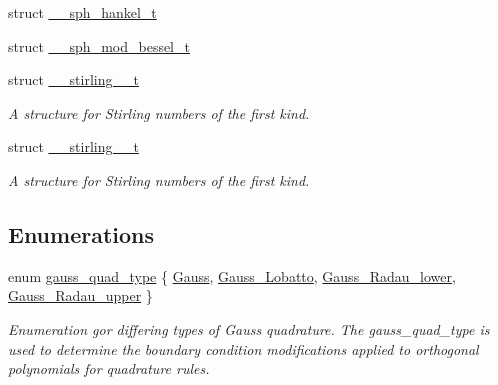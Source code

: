 \begin{DoxyCompactItemize}
\item 
struct \hyperlink{struct____gnu__cxx_1_1____sph__hankel__t}{\+\_\+\+\_\+sph\+\_\+hankel\+\_\+t}
\item 
struct \hyperlink{struct____gnu__cxx_1_1____sph__mod__bessel__t}{\+\_\+\+\_\+sph\+\_\+mod\+\_\+bessel\+\_\+t}
\item 
struct \hyperlink{struct____gnu__cxx_1_1____stirling__1__t}{\+\_\+\+\_\+stirling\+\_\+\_\+t}
\begin{DoxyCompactList}\small\item\em A structure for Stirling numbers of the first kind. \end{DoxyCompactList}\item 
struct \hyperlink{struct____gnu__cxx_1_1____stirling__2__t}{\+\_\+\+\_\+stirling\+\_\+\_\+t}
\begin{DoxyCompactList}\small\item\em A structure for Stirling numbers of the first kind. \end{DoxyCompactList}\end{DoxyCompactItemize}
\subsection*{Enumerations}
\begin{DoxyCompactItemize}
\item 
enum \hyperlink{namespace____gnu__cxx_a2ed4d746fa11452ef08bae893e031cb3}{gauss\+\_\+quad\+\_\+type} \{ \hyperlink{namespace____gnu__cxx_a2ed4d746fa11452ef08bae893e031cb3ad00ef6cda3d451846a98f19dfe9b84c5}{Gauss}, 
\hyperlink{namespace____gnu__cxx_a2ed4d746fa11452ef08bae893e031cb3a38d16e167c31511553bf782c0c331076}{Gauss\+\_\+\+Lobatto}, 
\hyperlink{namespace____gnu__cxx_a2ed4d746fa11452ef08bae893e031cb3a901202872614ca163f6351106b642981}{Gauss\+\_\+\+Radau\+\_\+lower}, 
\hyperlink{namespace____gnu__cxx_a2ed4d746fa11452ef08bae893e031cb3ab93f55d4c8c412ce64cc234d8eedccbd}{Gauss\+\_\+\+Radau\+\_\+upper}
 \}\begin{DoxyCompactList}\small\item\em Enumeration gor differing types of Gauss quadrature. The gauss\+\_\+quad\+\_\+type is used to determine the boundary condition modifications applied to orthogonal polynomials for quadrature rules. \end{DoxyCompactList}
\end{DoxyCompactItemize}
